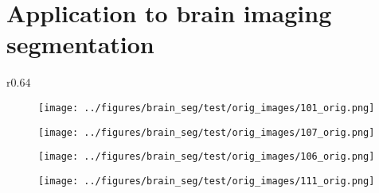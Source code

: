 \section{Application to brain imaging segmentation}
\vspace{-0.3cm}
	\begin{wrapfigure}{r}{0.64\textwidth} %
	\vspace{-0.4cm}
	\captionsetup{width=0.58\textwidth}
	\centering
	\begin{subfigure}[b]{0.03\textwidth} %
		\centering
	\end{subfigure}
	\hspace{0.2cm}
	\begin{subfigure}{0.14\textwidth}
		\centering
		\texttt{[image: ../figures/brain\_seg/test/orig\_images/101\_orig.png]}
		\label{fig:1}
	\end{subfigure}
	\begin{subfigure}{0.14\textwidth}
		\centering
		\texttt{[image: ../figures/brain\_seg/test/orig\_images/107\_orig.png]}
		\label{fig:2}
	\end{subfigure}
	\begin{subfigure}{0.14\textwidth}
		\centering
		\texttt{[image: ../figures/brain\_seg/test/orig\_images/106\_orig.png]}
		\label{fig:3}
	\end{subfigure}
	\begin{subfigure}{0.14\textwidth}
		\centering
		\texttt{[image: ../figures/brain\_seg/test/orig\_images/111\_orig.png]}
		\label{fig:4}
	\end{subfigure}
	\vspace{-0.3cm}
	\\
	\begin{subfigure}[b]{0.03\textwidth} %
		\centering
	\end{subfigure}

\end{wrapfigure}
